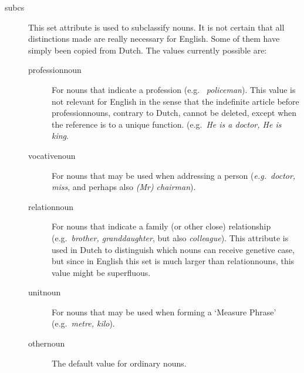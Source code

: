 \begin{description}
\item[subcs] This set attribute is used to subclassify nouns. It is not certain 
that all distinctions made are really necessary for English. Some of them have 
simply been copied from Dutch. The values currently possible are:
  \begin{description}
  \item[professionnoun] For nouns that indicate a profession (e.g.\ {\em 
policeman\/}). This value is not relevant for English in the sense that 
the indefinite article before professionnouns, contrary to Dutch, cannot be 
deleted, except when the reference is to a unique function. (e.g.\ {\em He is a 
doctor, He is king\/}.
  \item[vocativenoun] For nouns that may be used 
when addressing a person ({\em e.g.\ 
doctor, miss\/}, and perhaps also {\em (Mr) chairman\/}).
  \item[relationnoun] For nouns that indicate a family (or other close) 
relationship (e.g.\ {\em brother, granddaughter\/}, but also {\em 
colleague\/}). This attribute is used in Dutch to distinguish which nouns can 
receive genetive case, but since in English this set is much larger than 
relationnouns, this value might be superfluous.
  \item[unitnoun] For nouns that may be used when forming a `Measure Phrase'
(e.g.\ {\em metre, kilo\/}).
  \item[othernoun] The default value for ordinary nouns.
  \end{description}


\end{description}

